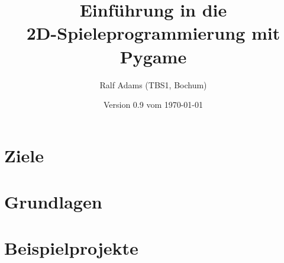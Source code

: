 \documentclass[a4paper,12pt,twoside]{scrreprt}
\begin{document}
  \title{Einführung in die\\2D-Spieleprogrammierung mit Pygame}
  \author{Ralf Adams (TBS1, Bochum)}
  \date{Version 0.9 vom \today}
  \maketitle
  \tableofcontents

\setlength{\parindent}{0.0em}
\setlength{\parskip}{1.0ex plus0.5ex minus0.5ex}
\setlength{\itemsep}{-0.3ex plus0.2ex}


\chapter{Ziele}
\chapter{Grundlagen}\label{secGrundlagen}















\chapter{Beispielprojekte}



\listoffigures

\printglossaries
\printindex
{}
\end{document}
